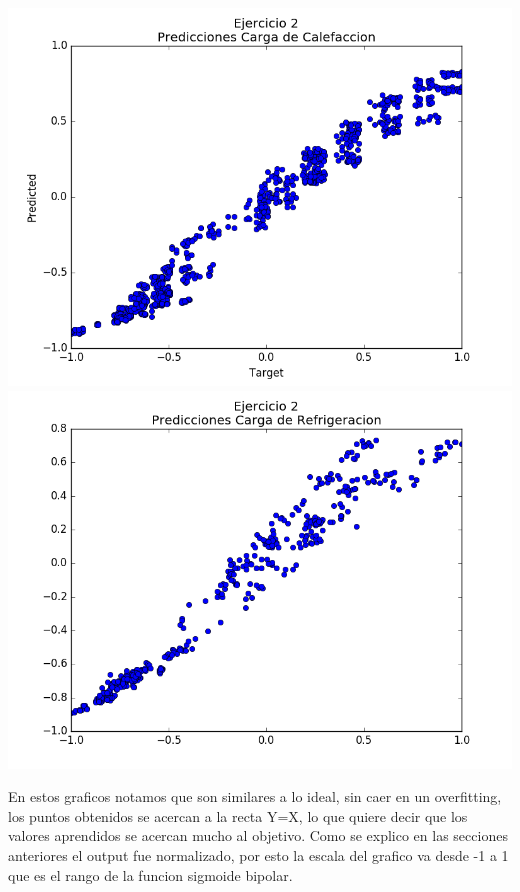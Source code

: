 \includegraphics[scale=0.4]{img/ej2-calef}
\includegraphics[scale=0.4]{img/ej2-refrig}


En estos graficos notamos que son similares a lo ideal, sin caer en un overfitting, los puntos obtenidos se acercan a la recta Y=X, lo que quiere decir que los valores aprendidos se acercan mucho al objetivo.
Como se explico en las secciones anteriores el output fue normalizado, por esto la escala del grafico va desde -1 a 1 que es el rango de la funcion sigmoide bipolar.
